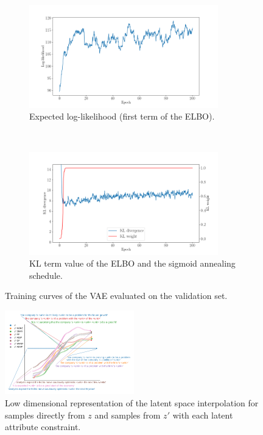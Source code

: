 \documentclass[11pt,letterpaper]{article}
\begin{document}
\begin{figure}[t!]
    \centering
    \begin{subfigure}{0.5\textwidth}
        \centering
        \includegraphics[width=0.9\textwidth]{fig/valid_nll.png}
        \caption{Expected log-likelihood (first term of the ELBO).}
    \end{subfigure}%
    ~ 
    \begin{subfigure}{0.5\textwidth}
        \centering
        \includegraphics[width=0.9\textwidth]{fig/kl_valid.png}
        \caption{KL term value of the ELBO and the sigmoid annealing schedule.}
    \end{subfigure}
    \caption{Training curves of the VAE evaluated on the validation set.}
    \label{vae_train}
\end{figure}

\begin{figure}
    \centering
    \includegraphics[width=0.5\textwidth]{fig/latent_interp_pretty.png}
    \caption{Low dimensional representation of the latent space interpolation for samples directly from $z$ and samples from $z'$ with each latent attribute constraint.}
    \label{interp}
\end{figure}
\end{document}
